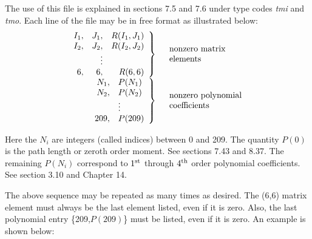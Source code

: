      The use of this file is explained in sections 7.5 and 7.6 under type
codes {\em tmi} and {\em tmo}.   Each line of the file may be in free format as illustrated below:
\[\begin{array}{rl}
\left. \begin{array}{rrr}
       I_1, & J_1, & R(I_1,J_1) \\
       I_2, & J_2, & R(I_2,J_2) \\
              & \vdots &                \\
       6, & 6, & R(6,6)
       \end{array} \right\}     &
       \begin{tabular}{l}
       nonzero matrix \\
       elements
       \end{tabular} \\
\left. \begin{array}{rl}
       N_1, & P(N_1)  \\
       N_2, & P(N_2)   \\
              & \vdots        \\
       209, & P(209) \\
       \end{array} \right\}     &
       \begin{tabular}{l}
       nonzero polynomial \\
       coefficients
       \end{tabular}
\end{array}\]


Here the $N_i$ are integers (called \Mary indices) between 0 and 209.  The quantity $P(0)$ is the
path length or zeroth order moment.  See sections 7.43 and 8.37.  The remaining $P(N_i)$ correspond to
$1^{\mbox{\scriptsize st}}$ through $4^{\mbox{\scriptsize th}}$ order
polynomial coefficients.  See section 3.10 and Chapter 14.

     The above sequence may be repeated as many times as desired.  The
(6,6) matrix element must always be the last element listed, even if it is
zero. Also, the last polynomial entry \{209,$P(209)$\} must be listed, even if
it is zero.  An example is shown below:


